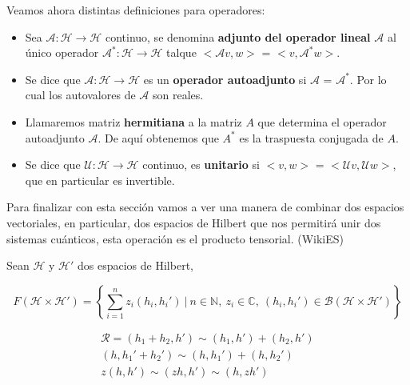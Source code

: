 \newpage

Veamos ahora distintas definiciones para operadores:
\begin{itemize}
    \item Sea $\mathscr{A}:\mathscr{H} \rightarrow \mathscr{H}$ continuo, se denomina \textbf{adjunto del operador lineal} $\mathscr{A}$ al único operador   $\mathscr{A}^{*}:\mathscr{H} \rightarrow \mathscr{H}$ talque $<\mathscr{A}v,w>$ = $<v,\mathscr{A}^{*}w>$.
    \item Se dice que $\mathscr{A}:\mathscr{H} \rightarrow \mathscr{H}$ es un \textbf{operador autoadjunto} si $\mathscr{A}$ = $\mathscr{A}^{*}$. Por lo cual los autovalores de $\mathscr{A}$ son reales.
    \item Llamaremos matriz \textbf{hermitiana} a la matriz $A$ que determina el operador autoadjunto $\mathscr{A}$. De aquí obtenemos que $A^{*}$ es la traspuesta conjugada de $A$.
    \item Se dice que $\mathscr{U}:\mathscr{H} \rightarrow \mathscr{H}$  continuo, es \textbf{unitario} si $<v,w>$ = $<\mathscr{U}v,\mathscr{U}w>$, que en particular es invertible.
\end{itemize}

\vspace{5pt}

Para finalizar con esta sección vamos a ver una manera de combinar dos espacios vectoriales, en particular, dos espacios de Hilbert que nos permitirá unir dos sistemas cuánticos, esta operación es el producto tensorial.\cite{B:Nielsen:2002} (WikiES)

\vspace{10pt}

Sean $\mathscr{H}$ y $\mathscr{H}'$ dos espacios de Hilbert,

\vspace{5pt}
\begin{equation*}
    F(\mathscr{H} \times \mathscr{H}') = \left\lbrace \sum_{i=1}^{n}z_{i} (h_{i},h_{i}')\:|\:n \in \mathbb{N},\: z_{i} \in \mathbb{C},\:(h_{i},h_{i}') \in \mathscr{B}(\mathscr{H} \times \mathscr{H}') \right\rbrace
\end{equation*}

\vspace{5pt}
\begin{equation*}
\begin{split}
    \mathscr{R} =  (h_{1}+h_{2},h') \sim (h_{1},h') + (h_{2},h') \\ 
    (h,h_{1}'+h_{2}') \sim (h,h_{1}') + (h,h_{2}') \\
    z(h,h') \sim (z h,h') \sim (h,z h')
\end{split}
\end{equation*}

